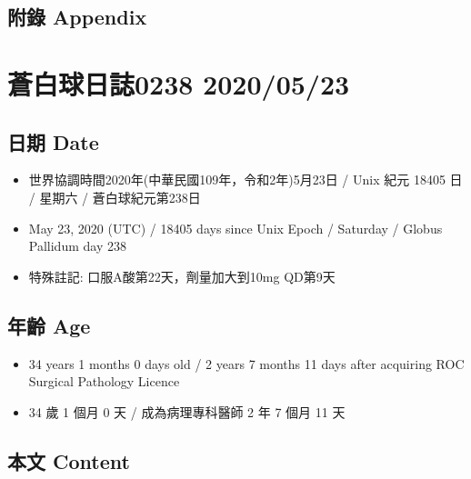 \documentclass[a5paper, 12pt
]{book}
\providecommand{\tightlist}{%
  \setlength{\itemsep}{0pt}\setlength{\parskip}{0pt}}
\begin{document}
\hypertarget{ux9644ux9304-appendix-82}{%
\subsection{附錄 Appendix}\label{ux9644ux9304-appendix-82}}

\hypertarget{ux84bcux767dux7403ux65e5ux8a8c0238-20200523}{%
\section{蒼白球日誌0238
2020/05/23}\label{ux84bcux767dux7403ux65e5ux8a8c0238-20200523}}

\hypertarget{ux65e5ux671f-date-83}{%
\subsection{日期 Date}\label{ux65e5ux671f-date-83}}

\begin{itemize}
\tightlist
\item
  世界協調時間2020年(中華民國109年，令和2年)5月23日 / Unix 紀元 18405 日
  / 星期六 / 蒼白球紀元第238日
\item
  May 23, 2020 (UTC) / 18405 days since Unix Epoch / Saturday / Globus
  Pallidum day 238
\item
  特殊註記: 口服A酸第22天，劑量加大到10mg QD第9天
\end{itemize}

\hypertarget{ux5e74ux9f61-age-83}{%
\subsection{年齡 Age}\label{ux5e74ux9f61-age-83}}

\begin{itemize}
\tightlist
\item
  34 years 1 months 0 days old / 2 years 7 months 11 days after
  acquiring ROC Surgical Pathology Licence
\item
  34 歲 1 個月 0 天 / 成為病理專科醫師 2 年 7 個月 11 天
\end{itemize}

\hypertarget{ux672cux6587-content-83}{%
\subsection{本文 Content}\label{ux672cux6587-content-83}}
\end{document}
